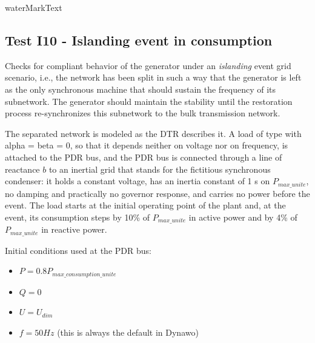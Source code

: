     {{ waterMarkText }}

    \renewcommand{\DTRPcs}{Islanding} %
    \renewcommand{\PCSname}{PCS_RTE-I16z3}
    \renewcommand{\OCname}{DeltaP10DeltaQ4Consumption}


    \subsection{Test I10 - Islanding event in consumption}

    Checks for compliant behavior of the generator under an
    \emph{islanding} event grid scenario, i.e., the network has been split in
    such a way that the generator is left as the only synchronous machine
    that should sustain the frequency of its subnetwork. The generator
    should maintain the stability until the restoration process
    re-synchronizes this subnetwork to the bulk transmission network.

    \GridCircuitZthree

    The separated network is modeled as the DTR describes it. A load of type
     with alpha = beta = 0, so that it depends neither on
    voltage nor on frequency, is attached to the PDR bus, and the PDR bus is
    connected through a line of reactance $b$ to an inertial grid that stands
    for the fictitious synchronous condenser: it holds a constant voltage, has
    an inertia constant of 1 s on $P_{max\_unite}$, no damping and practically
    no governor response, and carries no power before the event. The load
    starts at the initial operating point of the plant and, at the event, its
    consumption steps by 10\% of $P_{max\_unite}$ in active power and by 4\%
    of $P_{max\_unite}$ in reactive power.

    \begin{description}
        \item Initial conditions used at the PDR bus:
        \begin{itemize}
            \item $P = 0.8 P_{max\_consumption\_unite}$
            \item $Q = 0$
            \item $U = U_{dim}$
            \item $f = 50 Hz$ (this is always the default in Dynawo)
        \end{itemize}
    \end{description}

